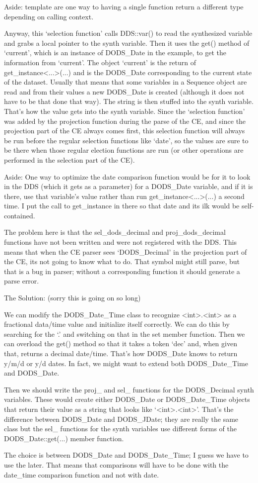 \documentclass[12pt]{article}
\begin{document}
    Aside: template are one way to having a single function return a
    different type depending on calling context.

Anyway, this `selection function' calls DDS::var() to read the synthesized
variable and grabs a local pointer to the synth variable. Then it uses the
get() method of `current', which is an instance of DODS_Date in the example,
to get the information from `current'. The object `current' is the return of
get_instance<...>(...) and is the DODS_Date corresponding to the current
state of the dataset. Usually that means that some variables in a Sequence
object are read and from their values a new DODS_Date is created (although it
does not have to be that done that way). The string is then stuffed into the
synth variable. That's how the value gets into the synth variable. Since the
`selection function' was added by the projection function during the parse of
the CE, and since the projection part of the CE always comes first, this
selection function will always be run before the regular selection functions
like `date', so the values are sure to be there when those regular election
functions are run (or other operations are performed in the selection part of
the CE).

    Aside: One way to optimize the date comparison function would be for it
    to look in the DDS (which it gets as a parameter) for a DODS_Date
    variable, and if it is there, use that variable's value rather than run
    get_instance<...>(...) a second time. I put the call to get_instance in
    there so that date and its ilk would be self-contained.

The problem here is that the sel_dods_decimal and proj_dods_decimal functions
have not been written and were not registered with the DDS. This means that
when the CE parser sees `DODS_Decimal' in the projection part of the CE, its
not going to know what to do. That symbol might still parse, but that is a bug
in parser; without a corresponding function it should generate a parse error.

The Solution: (sorry this is going on so long)

We can modify the DODS_Date_Time class to recognize <int>.<int> as a
fractional data/time value and initialize itself correctly. We can do this by
searching for the `.' and switching on that in the set member function. Then
we can overload the get() method so that it takes a token `dec' and, when
given that, returns a decimal date/time. That's how DODS_Date knows to return
y/m/d or y/d dates. In fact, we might want to extend both DODS_Date_Time and
DODS_Date.

Then we should write the proj_ and sel_ functions for the DODS_Decimal synth
variables. These would create either DODS_Date or DODS_Date_Time objects that
return their value as a string that looks like `<int>.<int>'. That's the
difference between DODS_Date and DODS_JDate; they are really the same class
but the sel_ functions for the synth variables use different forms of the
DODS_Date::get(...) member function.

The choice is between DODS_Date and DODS_Date_Time; I guess we have to use
the later. That means that comparisons will have to be done with the
date_time comparison function and not with date.
\end{document}
